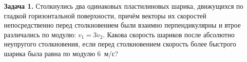 
\begin{taskbasic}[code={\label{task:mechanics_v1_n22}}]
\textbf{Задача 1.} Столкнулись два одинаковых пластилиновых шарика, движущихся по гладкой горизонтальной поверхности, причём векторы их скоростей непосредственно перед столкновением были взаимно перпендикулярны и втрое различались по модулю: $v_1 = 3v_2$. Какова скорость шариков после абсолютно неупругого столкновения, если перед столкновением скорость более быстрого шарика была равна по модулю $6$~м/с?

\end{taskbasic}

